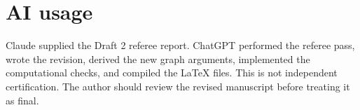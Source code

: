 \documentclass[12pt,letterpaper]{article}
\begin{document}
\section{AI usage}
Claude supplied the Draft 2 referee report. ChatGPT performed the referee pass, wrote the revision, derived the new graph arguments, implemented the computational checks, and compiled the LaTeX files. This is not independent certification. The author should review the revised manuscript before treating it as final.
\end{document}

